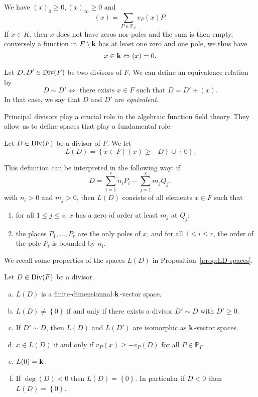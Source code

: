 We have $(x)_0\geq0, (x)_\infty\geq0$ and
\[
  (x) = \sum_{P\in\mathbb{P}_F}v_P(x)P.
\]
If $x\in K$, then $x$ does not have zeros nor poles and the sum is then empty,
conversely a function in $F\setminus\mathbf{k}$ has at least one zero and one pole, we
thus have
\[
  x\in\mathbf{k}\Leftrightarrow (x)=0.
\]
\begin{defi}[Equivalence]
  Let $D, D'\in\operatorname{Div}(F)$ be two divisors of $F$. We can define an equivalence
  relation by
  \[
    D\sim D'\Longleftrightarrow\text{ there exists }x\in F\text{ such that }D =
    D'+(x).
  \]
  In that case, we say that $D$ and $D'$ are \emph{equivalent}.
\end{defi}
Principal divisors play a crucial role in the algebraic function field theory.
They allow us to define spaces that play a fundamental role.
\begin{defi}
  Let $D\in\operatorname{Div}(F)$ be a divisor of $F$. We let
  \[
    L(D) = \left\{ x\in F\mid(x)\geq -D \right\}\cup\left\{ 0 \right\}.
  \]
\end{defi}
This definition can be interpreted in the following way: if
\[
  D = \sum_{i=1}^rn_iP_i - \sum_{j=1}^sm_jQ_j,
\]
with $n_i>0$ and $m_j>0$, then $L(D)$ consists of all elements $x\in F$ such
that
\begin{enumerate}
  \item for all $1\leq j\leq s$, $x$ has a zero of order at least $m_j$ at $Q_j$;
  \item the places $P_1, \dots, P_r$ are the only poles of $x$, and for all
    $1\leq i\leq r$, the order of the pole $P_i$ is bounded by $n_i$.
\end{enumerate}
We recall some properties of the spaces $L(D)$ in
Proposition~\ref{prop:LD-spaces}.
\begin{prop}
  \label{prop:LD-spaces}
 Let $D\in\operatorname{Div}(F)$ be a divisor.
 \begin{enumerate}[(a)]
   \item $L(D)$ is a finite-dimensionnal $\mathbf{k}$-vector space.
   \item $L(D)\neq\left\{ 0 \right\}$ if and only if there exists a divisor
     $D'\sim D$ with $D'\geq0$.
   \item If $D'\sim D$, then $L(D)$ and $L(D')$ are isomorphic as $\mathbf{k}$-vector
     spaces.
   \item $x\in L(D)$ if and only if $v_P(x)\geq - v_P(D)$ for all
     $P\in\mathbb{P}_F$.
   \item $L(0)=\mathbf{k}$.
   \item If $\deg(D)<0$ then $L(D)=\left\{ 0 \right\}$. In particular if $D<0$
     then $L(D)=\left\{ 0 \right\}$.
 \end{enumerate}
\end{prop}
